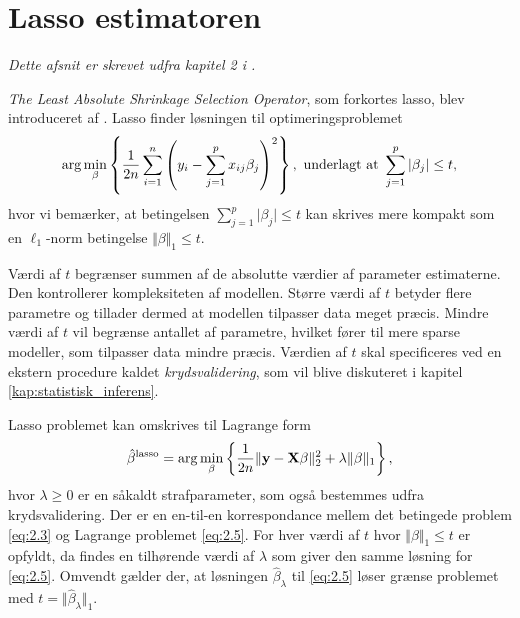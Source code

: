 \section{Lasso estimatoren} \label{sec:lasso_estimatoren}
\textit{Dette afsnit er skrevet udfra kapitel 2 i \citep{hastie}.}

\textit{The Least Absolute Shrinkage Selection Operator}, som forkortes lasso, blev introduceret af \citep{lasso}. 
Lasso finder løsningen til optimeringsproblemet
\begin{align}
\arg \min_{\beta} \cbr{\frac{1}{2n} \sum_{i=1}^n \del{y_i - \sum_{j=1}^p x_{ij} \beta_j}^2}, \ \text{underlagt at } \sum_{j=1}^p \vert \beta_j \vert \leq t, \label{eq:2.3}
\end{align} 
hvor vi bemærker, at betingelsen $\sum_{j=1}^p \vert \beta_j \vert \leq t$ kan skrives mere kompakt som en \(\ell_1\)-norm betingelse $\Vert \beta \Vert_1 \leq t$.

Værdi af \(t\) begrænser summen af de absolutte værdier af parameter estimaterne.
Den kontrollerer kompleksiteten af modellen. 
Større værdi af \(t\) betyder flere parametre og tillader dermed at modellen tilpasser data meget præcis.
Mindre værdi af \(t\) vil begrænse antallet af parametre, hvilket fører til mere sparse modeller, som tilpasser data mindre præcis.
Værdien af \(t\) skal specificeres ved en ekstern procedure kaldet \textit{krydsvalidering}, som vil blive diskuteret i kapitel \ref{kap:statistisk_inferens}.

Lasso problemet kan omskrives til Lagrange form
\begin{align}
\hat{\beta}^\text{lasso} = \arg \min_{\beta} \cbr{\frac{1}{2n} \Vert \y - \X \beta \Vert_2^2 + \lambda \Vert \beta \Vert_1}, \label{eq:2.5}
\end{align}
hvor $\lambda \geq 0$ er en såkaldt strafparameter, som også bestemmes udfra krydsvalidering. 
Der er en en-til-en korrespondance mellem det betingede problem \eqref{eq:2.3} og Lagrange problemet \eqref{eq:2.5}. 
For hver værdi af \(t\) hvor \(\Vert \beta \Vert_1 \leq t\) er opfyldt, da findes en tilhørende værdi af $\lambda$ som giver den samme løsning for \eqref{eq:2.5}.
Omvendt gælder der, at løsningen $\hat{\beta}_\lambda$ til \eqref{eq:2.5} løser grænse problemet med $t=\Vert \hat{\beta}_\lambda \Vert_1$.

